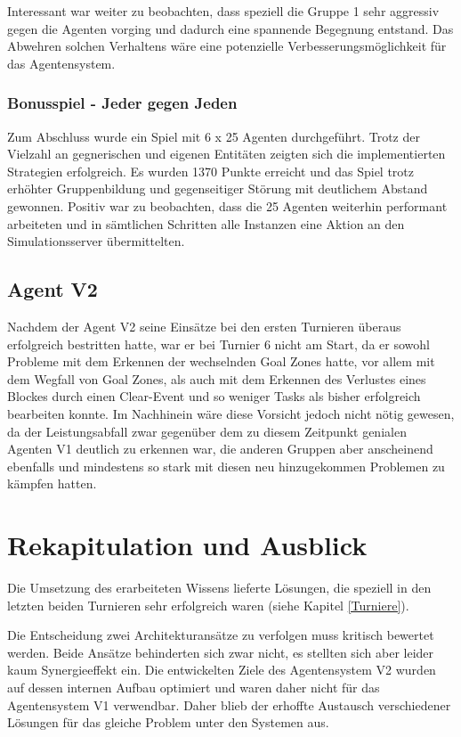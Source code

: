 \documentclass[runningheads]{llncs}
\begin{document}
	Interessant war weiter zu beobachten, dass speziell die Gruppe 1 sehr aggressiv gegen die Agenten vorging und dadurch eine spannende Begegnung entstand. Das Abwehren solchen Verhaltens wäre eine potenzielle Verbesserungsmöglichkeit für das Agentensystem. 
	
	\subsubsection{Bonusspiel - Jeder gegen Jeden}
	Zum Abschluss wurde ein Spiel mit 6 x 25 Agenten durchgeführt. Trotz der Vielzahl an gegnerischen und eigenen Entitäten zeigten sich die implementierten Strategien erfolgreich. Es wurden 1370 Punkte erreicht und das Spiel trotz erhöhter Gruppenbildung und gegenseitiger Störung mit deutlichem Abstand gewonnen.
	Positiv war zu beobachten, dass die 25 Agenten weiterhin performant arbeiteten und in sämtlichen Schritten alle Instanzen eine Aktion an den Simulationsserver übermittelten.
	
	\subsection{Agent V2}
	 Nachdem der Agent V2 seine Einsätze bei den ersten Turnieren überaus erfolgreich bestritten hatte, war er bei Turnier 6 nicht am Start, da er sowohl Probleme mit dem Erkennen der wechselnden Goal Zones hatte, vor allem mit dem Wegfall von Goal Zones, als auch mit dem Erkennen des Verlustes eines Blockes durch einen Clear-Event und so weniger Tasks als bisher erfolgreich bearbeiten konnte. Im Nachhinein wäre diese Vorsicht jedoch nicht nötig gewesen, da der Leistungsabfall zwar gegenüber dem zu diesem Zeitpunkt genialen Agenten V1 deutlich zu erkennen war, die anderen Gruppen aber anscheinend ebenfalls und mindestens so stark mit diesen neu hinzugekommen Problemen zu kämpfen hatten.
	
	\section{Rekapitulation und Ausblick}
	Die Umsetzung des erarbeiteten Wissens lieferte Lösungen, die speziell in den letzten beiden Turnieren sehr erfolgreich waren (siehe Kapitel \ref{Turniere}).
	
	
	Die Entscheidung zwei Architekturansätze zu verfolgen muss kritisch bewertet werden. Beide Ansätze behinderten sich zwar nicht, es stellten sich aber leider kaum Synergieeffekt ein. Die entwickelten Ziele des Agentensystem V2 wurden auf dessen internen Aufbau optimiert und waren daher nicht für das Agentensystem V1 verwendbar. Daher blieb der erhoffte Austausch verschiedener Lösungen für das gleiche Problem unter den Systemen aus.
	
\end{document}
